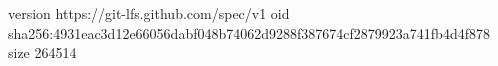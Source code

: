 version https://git-lfs.github.com/spec/v1
oid sha256:4931eac3d12e66056dabf048b74062d9288f387674cf2879923a741fb4d4f878
size 264514
